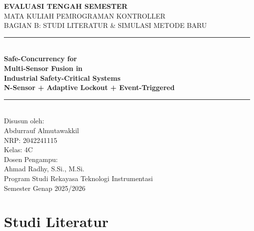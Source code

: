 \documentclass[12pt,a4paper]{article}
\begin{document}
\begin{titlepage}
\centering
\vspace*{2cm}
{\LARGE\bfseries EVALUASI TENGAH SEMESTER\\[0.3cm]}
{\Large MATA KULIAH PEMROGRAMAN KONTROLLER\\[0.5cm]}
{\large BAGIAN B: STUDI LITERATUR \& SIMULASI METODE BARU\\[1.5cm]}

\rule{\linewidth}{0.5pt}\\[0.5cm]
{\huge\bfseries Safe-Concurrency for\\Multi-Sensor Fusion in\\Industrial Safety-Critical Systems\\[0.2cm]}
{\Large\bfseries N-Sensor + Adaptive Lockout + Event-Triggered\\[0.5cm]}

\rule{\linewidth}{0.5pt}\\[1.5cm]
{\large Disusun oleh:\\[0.5cm]}
{\Large Abdurrauf Almutawakkil\\NRP:  2042241115\\[0.3cm]}
{\large Kelas: 4C\\[0.5cm]}
{\large Dosen Pengampu:\\[0.3cm]}
{\large Ahmad Radhy, S.Si., M.Si.\\[1.5cm]}
Program Studi Rekayasa Teknologi Instrumentasi\\
Semester Genap 2025/2026\\[2cm]
\end{titlepage}

\tableofcontents
\newpage

\section{Studi Literatur}
\end{document}
